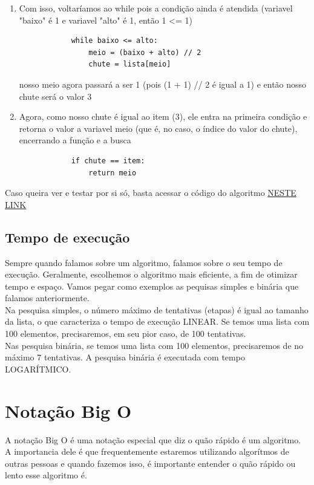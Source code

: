 \documentclass{report}
\begin{document}
\begin{enumerate}
		\item Com isso, voltaríamos ao while pois a condição ainda é atendida (variavel "baixo" é 1 e variavel "alto" é 1, então 1 <= 1)\begin{verbatim}
			while baixo <= alto:
				meio = (baixo + alto) // 2
				chute = lista[meio]
		\end{verbatim} nosso meio agora passará a ser 1 (pois (1 + 1) // 2 é igual a 1) e então nosso chute será o valor 3
		
		\item Agora, como nosso chute é igual ao item (3), ele entra na primeira condição e retorna o valor a variavel meio (que é, no caso, o índice do valor do chute), encerrando a função e a busca\begin{verbatim}
			if chute == item:
				return meio
		\end{verbatim}
		
	\end{enumerate}
	
	Caso queira ver e testar por si só, basta acessar o código do algoritmo \href{URL}{NESTE LINK}
	
	
	
	\subsection{Tempo de execução}
	
	Sempre quando falamos sobre um algoritmo, falamos sobre o seu tempo de execução. Geralmente, escolhemos o algoritmo mais eficiente, a fim de otimizar tempo e espaço. Vamos pegar como exemplos as pequisas simples e binária que falamos anteriormente. \\
	
	Na pesquisa simples, o número máximo de tentativas (etapas) é igual ao tamanho da lista, o que caracteriza o tempo de execução LINEAR. Se temos uma lista com 100 elementos, precisaremos, em seu pior caso, de 100 tentativas. \\ 
	
	Nas pesquisa binária, se temos uma lista com 100 elementos, precisaremos de no máximo 7 tentativas. A pesquisa binária é executada com tempo LOGARÍTMICO.
	
	\section{Notação Big O}
	
	A notação Big O é uma notação especial que diz o quão rápido é um algoritmo. A importancia dele é que frequentemente estaremos utilizando algorítmos de outras pessoas e quando fazemos isso, é importante entender o quão rápido ou lento esse algoritmo é.
	
\end{document}

